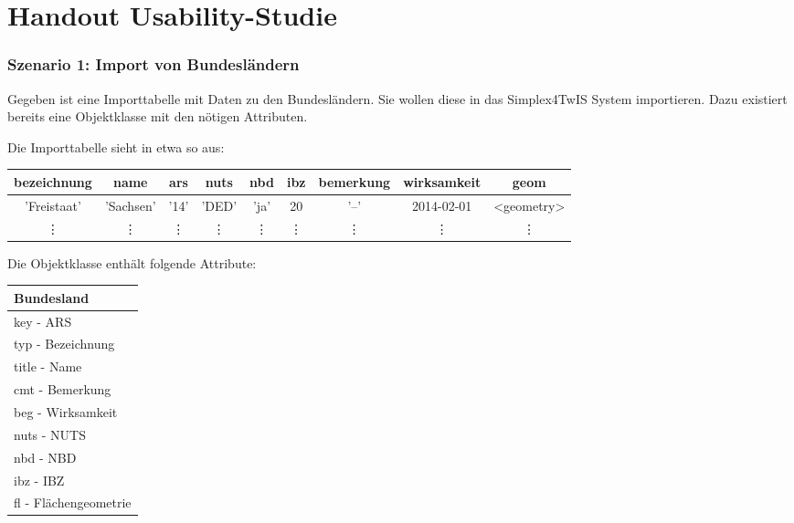 \ifdefined\STANDALONE\else
  \chapter{Handout Usability-Studie}
  \label{app:handout}
\fi

\subsection*{Szenario 1: Import von Bundesländern}

\vspace{\baselineskip}\noindent
Gegeben ist eine Importtabelle mit Daten zu den Bundesländern. Sie wollen diese in das Simplex4TwIS System importieren. Dazu existiert bereits eine Objektklasse mit den nötigen Attributen.

\vspace{\baselineskip}\noindent
Die Importtabelle sieht in etwa so aus:

\begin{flushleft}
  \begin{tabular}{||c | c | c | c | c | c | c | c | c ||}
    \hline
    bezeichnung & name      & ars    & nuts   & nbd    & ibz    & bemerkung & wirksamkeit & geom       \\ [0.5ex]
    \hline\hline
    'Freistaat' & 'Sachsen' & '14'   & 'DED'  & 'ja'   & 20     & '--'      & 2014-02-01  & <geometry> \\
    \hline
    \vdots      & \vdots    & \vdots & \vdots & \vdots & \vdots & \vdots    & \vdots      & \vdots     \\
    \hline
  \end{tabular}
\end{flushleft}

\vspace{\baselineskip}\noindent
Die Objektklasse enthält folgende Attribute:
\begin{flushleft}
  \begin{tabular}{ || l || }
    \hline
    Bundesland            \\
    \hline
    key - ARS             \\
    typ - Bezeichnung     \\
    title - Name          \\
    cmt - Bemerkung       \\
    beg - Wirksamkeit     \\
    nuts - NUTS           \\
    nbd - NBD             \\
    ibz - IBZ             \\
    fl - Flächengeometrie \\
    \hline
  \end{tabular}
\end{flushleft}

